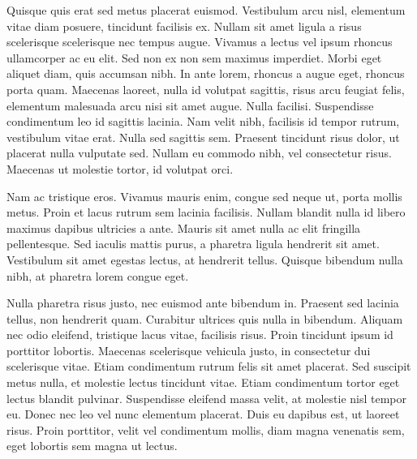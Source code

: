 \documentclass{sop}
\begin{document}
Quisque quis erat sed metus placerat euismod. Vestibulum arcu nisl, elementum vitae diam posuere, tincidunt facilisis ex. Nullam sit amet ligula a risus scelerisque scelerisque nec tempus augue. Vivamus a lectus vel ipsum rhoncus ullamcorper ac eu elit. Sed non ex non sem maximus imperdiet. Morbi eget aliquet diam, quis accumsan nibh. In ante lorem, rhoncus a augue eget, rhoncus porta quam. Maecenas laoreet, nulla id volutpat sagittis, risus arcu feugiat felis, elementum malesuada arcu nisi sit amet augue. Nulla facilisi. Suspendisse condimentum leo id sagittis lacinia. Nam velit nibh, facilisis id tempor rutrum, vestibulum vitae erat. Nulla sed sagittis sem. Praesent tincidunt risus dolor, ut placerat nulla vulputate sed. Nullam eu commodo nibh, vel consectetur risus. Maecenas ut molestie tortor, id volutpat orci.

Nam ac tristique eros. Vivamus mauris enim, congue sed neque ut, porta mollis metus. Proin et lacus rutrum sem lacinia facilisis. Nullam blandit nulla id libero maximus dapibus ultricies a ante. Mauris sit amet nulla ac elit fringilla pellentesque. Sed iaculis mattis purus, a pharetra ligula hendrerit sit amet. Vestibulum sit amet egestas lectus, at hendrerit tellus. Quisque bibendum nulla nibh, at pharetra lorem congue eget.

Nulla pharetra risus justo, nec euismod ante bibendum in. Praesent sed lacinia tellus, non hendrerit quam. Curabitur ultrices quis nulla in bibendum. Aliquam nec odio eleifend, tristique lacus vitae, facilisis risus. Proin tincidunt ipsum id porttitor lobortis. Maecenas scelerisque vehicula justo, in consectetur dui scelerisque vitae. Etiam condimentum rutrum felis sit amet placerat. Sed suscipit metus nulla, et molestie lectus tincidunt vitae. Etiam condimentum tortor eget lectus blandit pulvinar. Suspendisse eleifend massa velit, at molestie nisl tempor eu. Donec nec leo vel nunc elementum placerat. Duis eu dapibus est, ut laoreet risus. Proin porttitor, velit vel condimentum mollis, diam magna venenatis sem, eget lobortis sem magna ut lectus. 
\end{document}
